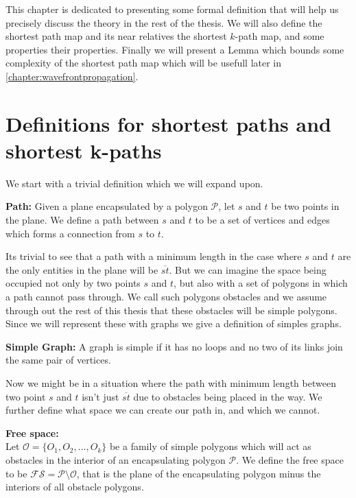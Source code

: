 \label{chapter:shortestpathmap}

This chapter is dedicated to presenting some formal definition that will help us
precisely discuss the theory in the rest of the thesis. We will also define the
shortest path map and its near relatives the shortest $k$-path map, and some properties
their properties. Finally we will present a Lemma which bounds some complexity of 
the shortest path map which will be usefull later in \ref{chapter:wavefrontpropagation}.

\section{Definitions for shortest paths and shortest k-paths}

We start with a trivial definition which we will expand upon.

\begin{mydef}\textbf{Path:}
Given a plane encapsulated by a polygon $\mathcal{P}$, let $s$ and $t$ be two
	points in the plane. We define a path between $s$ and $t$ to be a set of
	vertices and edges which forms a connection from $s$ to $t$.
\end{mydef}

Its trivial to see that a path with a minimum length in the case where $s$ and $t$
are the only entities in the plane will be $\overline{st}$. But we can imagine the
space being occupied not only by two points $s$ and $t$, but also with a set of 
polygons in which a path cannot pass through. We call such polygons obstacles and
we assume through out the rest of this thesis that these obstacles will be 
simple polygons. Since we will represent these with graphs we give a definition of 
simples graphs.

\begin{mydef}\textbf{Simple Graph:}
  A graph is simple if it has no loops and no two of its links join the same pair
  of vertices.
\end{mydef}

Now we might be in a situation where the path with minimum length between two point 
$s$ and $t$ isn't just $\overline{st}$ due to obstacles being placed in the way. We 
further define what space we can create our path in, and which we cannot.

\begin{mydef} 
	\textbf{Free space:}\\ 
	Let $\mathcal{O}=\{O_1,O_2,...,O_k\}$ be a
	family of simple polygons which will act as obstacles in the interior of an
	encapsulating polygon $\mathcal{P}$. We define the free space to be
	$\mathcal{FS}=\mathcal{P}\setminus\mathcal{O}$, that is the plane of the
	encapsulating polygon minus the interiors of all obstacle polygons.
\end{mydef}

